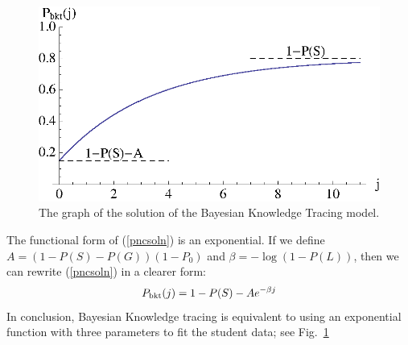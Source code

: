 \documentclass[11pt,letterpaper]{article}
\begin{document}
\begin{figure}
  \centering \includegraphics{exponential.eps}
   \caption{The graph of the solution of the Bayesian Knowledge
     Tracing model.}
    \label{bkt-function}
\end{figure}

The functional form of (\ref{pncsoln}) is an exponential.
If we define 
$A=\left(1-P(S)-P(G)\right) \left(1-P_0\right)$ and
$\beta=-\log(1-P(L))$, then we can rewrite (\ref{pncsoln}) in 
a clearer form:
%
\begin{equation}
         P_{\rm bkt}(j) = 1-P(S) -A e^{-\beta j}
\end{equation}
%
In conclusion, Bayesian Knowledge tracing is equivalent to using
an exponential function with three parameters to fit the student data;
see Fig.~\ref{bkt-function}


%
%
\end{document}
